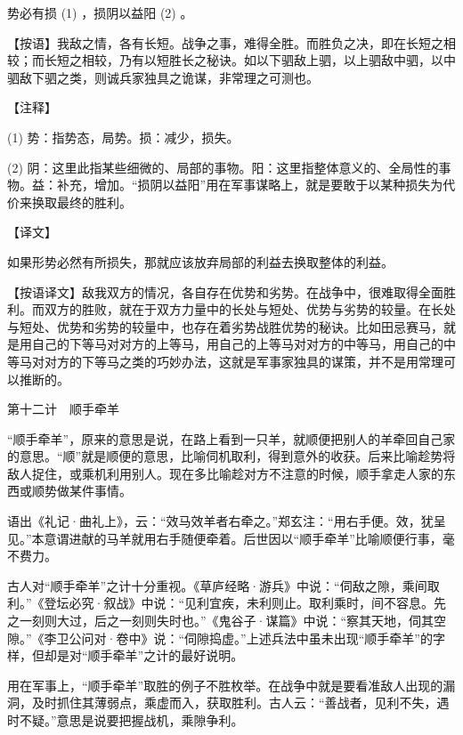 \documentclass[12pt,UTF8]{ctexbook}
\begin{document}
势必有损 (1) ，损阴以益阳 (2) 。

【按语】我敌之情，各有长短。战争之事，难得全胜。而胜负之决，即在长短之相较；而长短之相较，乃有以短胜长之秘诀。如以下驷敌上驷，以上驷敌中驷，以中驷敌下驷之类，则诚兵家独具之诡谋，非常理之可测也。





【注释】


(1) 势：指势态，局势。损：减少，损失。

(2) 阴：这里此指某些细微的、局部的事物。阳：这里指整体意义的、全局性的事物。益：补充，增加。“损阴以益阳”用在军事谋略上，就是要敢于以某种损失为代价来换取最终的胜利。





【译文】


如果形势必然有所损失，那就应该放弃局部的利益去换取整体的利益。

【按语译文】敌我双方的情况，各自存在优势和劣势。在战争中，很难取得全面胜利。而双方的胜败，就在于双方力量中的长处与短处、优势与劣势的较量。在长处与短处、优势和劣势的较量中，也存在着劣势战胜优势的秘诀。比如田忌赛马，就是用自己的下等马对对方的上等马，用自己的上等马对对方的中等马，用自己的中等马对对方的下等马之类的巧妙办法，这就是军事家独具的谋策，并不是用常理可以推断的。





第十二计　顺手牵羊


“顺手牵羊”，原来的意思是说，在路上看到一只羊，就顺便把别人的羊牵回自己家的意思。“顺”就是顺便的意思，比喻伺机取利，得到意外的收获。后来比喻趁势将敌人捉住，或乘机利用别人。现在多比喻趁对方不注意的时候，顺手拿走人家的东西或顺势做某件事情。

语出《礼记·曲礼上》，云：“效马效羊者右牵之。”郑玄注：“用右手便。效，犹呈见。”本意谓进献的马羊就用右手随便牵着。后世因以“顺手牵羊”比喻顺便行事，毫不费力。

古人对“顺手牵羊”之计十分重视。《草庐经略·游兵》中说：“伺敌之隙，乘间取利。”《登坛必究·叙战》中说：“见利宜疾，未利则止。取利乘时，间不容息。先之一刻则大过，后之一刻则失时也。”《鬼谷子·谋篇》中说：“察其天地，伺其空隙。”《李卫公问对·卷中》说：“伺隙捣虚。”上述兵法中虽未出现“顺手牵羊”的字样，但却是对“顺手牵羊”之计的最好说明。

用在军事上，“顺手牵羊”取胜的例子不胜枚举。在战争中就是要看准敌人出现的漏洞，及时抓住其薄弱点，乘虚而入，获取胜利。古人云：“善战者，见利不失，遇时不疑。”意思是说要把握战机，乘隙争利。
\end{document}
